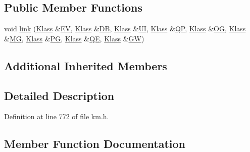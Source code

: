 \subsection*{Public Member Functions}
\begin{DoxyCompactItemize}
\item 
void \hyperlink{class_k_1_1k_lass_a1407574ee891838953937aa7cd68ec6b}{link} (\hyperlink{class_k_1_1_klass}{Klass} \&\hyperlink{class_k_1_1_e_v}{EV}, \hyperlink{class_k_1_1_klass}{Klass} \&\hyperlink{class_k_1_1_d_b}{DB}, \hyperlink{class_k_1_1_klass}{Klass} \&\hyperlink{class_k_1_1_u_i}{UI}, \hyperlink{class_k_1_1_klass}{Klass} \&\hyperlink{class_k_1_1_q_p}{QP}, \hyperlink{class_k_1_1_klass}{Klass} \&\hyperlink{class_k_1_1_o_g}{OG}, \hyperlink{class_k_1_1_klass}{Klass} \&\hyperlink{class_k_1_1_m_g}{MG}, \hyperlink{class_k_1_1_klass}{Klass} \&\hyperlink{class_k_1_1_p_g}{PG}, \hyperlink{class_k_1_1_klass}{Klass} \&\hyperlink{class_k_1_1_q_e}{QE}, \hyperlink{class_k_1_1_klass}{Klass} \&\hyperlink{class_k_1_1_g_w}{GW})
\end{DoxyCompactItemize}
\subsection*{Additional Inherited Members}


\subsection{Detailed Description}


Definition at line 772 of file km.\+h.



\subsection{Member Function Documentation}
